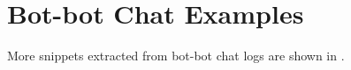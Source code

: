 \section{Bot-bot Chat Examples}
\label{sec:bot-bot chat}
More snippets extracted from bot-bot chat logs are shown in .

\begin{figure}[th]
 \centering
\end{figure}
